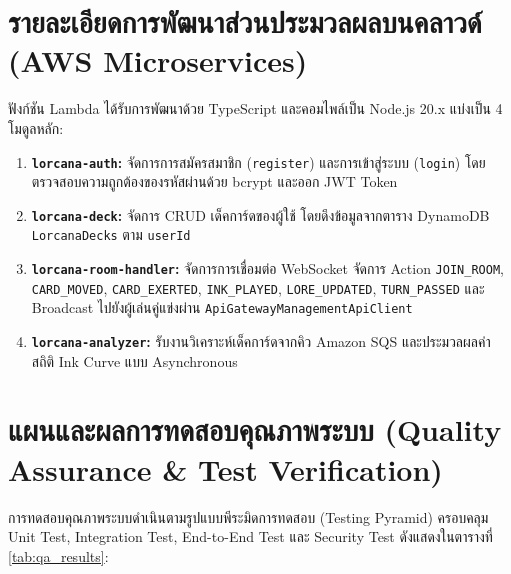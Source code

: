 \documentclass[12pt,a4paper]{report}
\begin{document}
\section{รายละเอียดการพัฒนาส่วนประมวลผลบนคลาวด์ (AWS Microservices)}
ฟังก์ชัน Lambda ได้รับการพัฒนาด้วย TypeScript และคอมไพล์เป็น Node.js 20.x แบ่งเป็น 4 โมดูลหลัก:
\begin{enumerate}
    \item \textbf{\texttt{lorcana-auth}:} จัดการการสมัครสมาชิก (\texttt{register}) และการเข้าสู่ระบบ (\texttt{login}) โดยตรวจสอบความถูกต้องของรหัสผ่านด้วย bcrypt และออก JWT Token
    \item \textbf{\texttt{lorcana-deck}:} จัดการ CRUD เด็คการ์ดของผู้ใช้ โดยดึงข้อมูลจากตาราง DynamoDB \texttt{LorcanaDecks} ตาม \texttt{userId}
    \item \textbf{\texttt{lorcana-room-handler}:} จัดการการเชื่อมต่อ WebSocket จัดการ Action \texttt{JOIN\_ROOM}, \texttt{CARD\_MOVED}, \texttt{CARD\_EXERTED}, \texttt{INK\_PLAYED}, \texttt{LORE\_UPDATED}, \texttt{TURN\_PASSED} และ Broadcast ไปยังผู้เล่นคู่แข่งผ่าน \texttt{ApiGatewayManagementApiClient}
    \item \textbf{\texttt{lorcana-analyzer}:} รับงานวิเคราะห์เด็คการ์ดจากคิว Amazon SQS และประมวลผลค่าสถิติ Ink Curve แบบ Asynchronous
\end{enumerate}

\section{แผนและผลการทดสอบคุณภาพระบบ (Quality Assurance \& Test Verification)}
การทดสอบคุณภาพระบบดำเนินตามรูปแบบพีระมิดการทดสอบ (Testing Pyramid) ครอบคลุม Unit Test, Integration Test, End-to-End Test และ Security Test ดังแสดงในตารางที่ \ref{tab:qa_results}:
\end{document}
